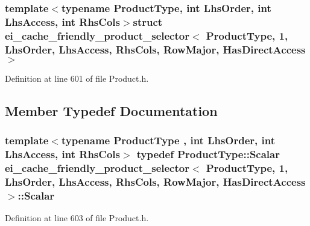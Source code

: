 \subsubsection*{template$<$typename Product\-Type, int Lhs\-Order, int Lhs\-Access, int Rhs\-Cols$>$struct ei\-\_\-cache\-\_\-friendly\-\_\-product\-\_\-selector$<$ Product\-Type, 1, Lhs\-Order, Lhs\-Access, Rhs\-Cols, Row\-Major, Has\-Direct\-Access $>$}



Definition at line 601 of file Product.\-h.



\subsection{Member Typedef Documentation}
\hypertarget{structei__cache__friendly__product__selector_3_01_product_type_00_011_00_01_lhs_order_00_01_lhs_627dd87edc006b05aea13eb6c873061a_a8d7806ab88a07576c1327a55efeff5eb}{
\subsubsection[{Scalar}]{\setlength{\rightskip}{0pt plus 5cm}template$<$typename Product\-Type , int Lhs\-Order, int Lhs\-Access, int Rhs\-Cols$>$ typedef Product\-Type\-::\-Scalar {\bf ei\-\_\-cache\-\_\-friendly\-\_\-product\-\_\-selector}$<$ Product\-Type, 1, Lhs\-Order, Lhs\-Access, Rhs\-Cols, {\bf Row\-Major}, {\bf Has\-Direct\-Access} $>$\-::{\bf Scalar}}}\label{structei__cache__friendly__product__selector_3_01_product_type_00_011_00_01_lhs_order_00_01_lhs_627dd87edc006b05aea13eb6c873061a_a8d7806ab88a07576c1327a55efeff5eb}


Definition at line 603 of file Product.\-h.



